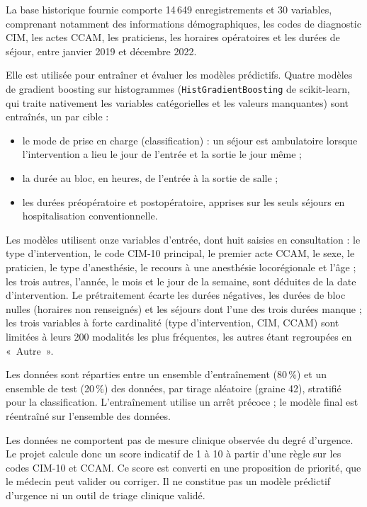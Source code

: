 \documentclass[11pt,a4paper]{article}
\begin{document}
La base historique fournie comporte 14\,649 enregistrements et 30 variables, comprenant notamment des informations démographiques, les codes de diagnostic CIM, les actes CCAM, les praticiens, les horaires opératoires et les durées de séjour, entre janvier 2019 et décembre 2022.

Elle est utilisée pour entraîner et évaluer les modèles prédictifs. Quatre modèles de gradient boosting sur histogrammes (\texttt{HistGradientBoosting} de scikit-learn, qui traite nativement les variables catégorielles et les valeurs manquantes) sont entraînés, un par cible :
\begin{itemize}
    \item le mode de prise en charge (classification) : un séjour est ambulatoire lorsque l'intervention a lieu le jour de l'entrée et la sortie le jour même ;
    \item la durée au bloc, en heures, de l'entrée à la sortie de salle ;
    \item les durées préopératoire et postopératoire, apprises sur les seuls séjours en hospitalisation conventionnelle.
\end{itemize}

Les modèles utilisent onze variables d'entrée, dont huit saisies en consultation : le type d'intervention, le code CIM-10 principal, le premier acte CCAM, le sexe, le praticien, le type d'anesthésie, le recours à une anesthésie locorégionale et l'âge ; les trois autres, l'année, le mois et le jour de la semaine, sont déduites de la date d'intervention. Le prétraitement écarte les durées négatives, les durées de bloc nulles (horaires non renseignés) et les séjours dont l'une des trois durées manque ; les trois variables à forte cardinalité (type d'intervention, CIM, CCAM) sont limitées à leurs 200 modalités les plus fréquentes, les autres étant regroupées en «~Autre~».

Les données sont réparties entre un ensemble d'entraînement (80\,\%) et un ensemble de test (20\,\%) des données, par tirage aléatoire (graine 42), stratifié pour la classification. L'entraînement utilise un arrêt précoce ; le modèle final est réentraîné sur l'ensemble des données.


Les données ne comportent pas de mesure clinique observée du degré d'urgence. Le projet calcule donc un score indicatif de 1 à 10 à partir d'une règle sur les codes CIM-10 et CCAM. Ce score est converti en une proposition de priorité, que le médecin peut valider ou corriger. Il ne constitue pas un modèle prédictif d'urgence ni un outil de triage clinique validé.
\end{document}
